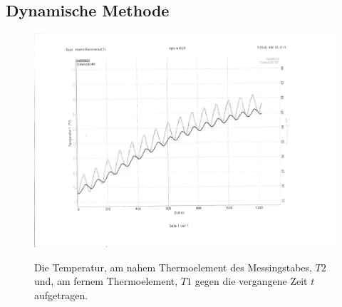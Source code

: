 \subsection{Dynamische Methode}
\begin{figure}
	\centering
	\caption{Die Temperatur, am nahem Thermoelement des Messingstabes, $T2$ und, am fernem Thermoelement, $T1$ gegen die vergangene Zeit $t$ aufgetragen.}
	\includegraphics[width=\linewidth-70pt,height=\textheight-70pt,keepaspectratio]{content/Bilder/T1T2-rotated.pdf}
	\label{fig:Graph5}
\end{figure}
\begin{table}
	\centering
	\caption{Die aus dem Graphen in Abbildung \ref{fig:Graph5} entnommenen Werte für die Phasendifferenz $\Delta t$ die Amplitude am nahem Thermoelement des breitem Messingstabes $A_\text{nah}$ und am fernem Thermoelement $A_\text{fern}$.}
	
\end{table}

